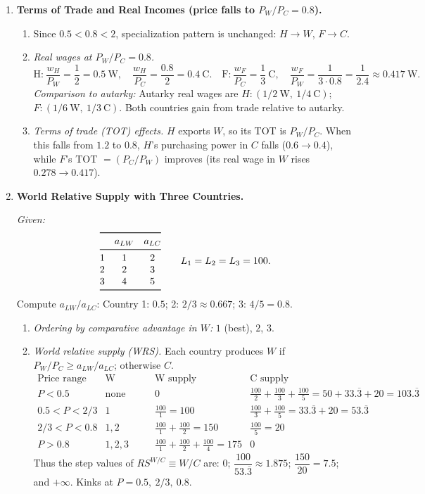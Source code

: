 \documentclass[11pt]{article}
\begin{document}
\begin{enumerate}[leftmargin=*, resume]
\newpage

\item \textbf{Terms of Trade and Real Incomes (price falls to $P_W/P_C=0.8$).}
\begin{enumerate}
\item Since $0.5<0.8<2$, specialization pattern is unchanged: $H\to W$, $F\to C$.

\item \emph{Real wages at $P_W/P_C=0.8$.}
\[
\text{H:}\ \frac{w_H}{P_W}=\frac{1}{2}=0.5\ \text{W},\quad
\frac{w_H}{P_C}=\frac{0.8}{2}=0.4\ \text{C}.
\quad
\text{F:}\ \frac{w_F}{P_C}=\frac{1}{3}\ \text{C},\quad
\frac{w_F}{P_W}=\frac{1}{3\cdot 0.8}=\frac{1}{2.4}\approx 0.417\ \text{W}.
\]
\emph{Comparison to autarky:} Autarky real wages are $H:(1/2\ \text{W},\ 1/4\ \text{C})$; $F:(1/6\ \text{W},\ 1/3\ \text{C})$. Both countries gain from trade relative to autarky.

\item \emph{Terms of trade (TOT) effects.} $H$ exports $W$, so its TOT is $P_W/P_C$. When this falls from $1.2$ to $0.8$, $H$'s purchasing power in $C$ falls ($0.6\to 0.4$), while $F$'s TOT $=(P_C/P_W)$ improves (its real wage in $W$ rises $0.278\to 0.417$).
\end{enumerate}

\item \textbf{World Relative Supply with Three Countries.}

\emph{Given:}
\[
\begin{array}{@{}lcc@{}}
\toprule
 & a_{LW} & a_{LC}\\
\midrule
1 & 1 & 2\\
2 & 2 & 3\\
3 & 4 & 5\\
\bottomrule
\end{array}
\qquad L_1=L_2=L_3=100.
\]
Compute $a_{LW}/a_{LC}$: Country 1: $0.5$; 2: $2/3\approx 0.667$; 3: $4/5=0.8$.

\begin{enumerate}
\item \emph{Ordering by comparative advantage in $W$:} $1$ (best), $2$, $3$.

\item \emph{World relative supply (WRS).} Each country produces $W$ if $P_W/P_C\ge a_{LW}/a_{LC}$; otherwise $C$.
\[
\begin{array}{l|c|c|c}
\text{Price range} & \text{W producers} & \text{W supply} & \text{C supply}\\
\hline
P<0.5 & \text{none} & 0 & \frac{100}{2}+\frac{100}{3}+\frac{100}{5}=50+33.\overline{3}+20=103.\overline{3}\\
0.5<P<2/3 & 1 & \frac{100}{1}=100 & \frac{100}{3}+\frac{100}{5}=33.\overline{3}+20=53.\overline{3}\\
2/3<P<0.8 & 1,2 & \frac{100}{1}+\frac{100}{2}=150 & \frac{100}{5}=20\\
P>0.8 & 1,2,3 & \frac{100}{1}+\frac{100}{2}+\frac{100}{4}=175 & 0
\end{array}
\]
Thus the step values of $RS^{W/C}\equiv W/C$ are: $0$; $\dfrac{100}{53.\overline{3}}\approx 1.875$; $\dfrac{150}{20}=7.5$; and $+\infty$.
Kinks at $P=0.5,\ 2/3,\ 0.8$.


\end{enumerate}
\end{enumerate}
\end{document}
